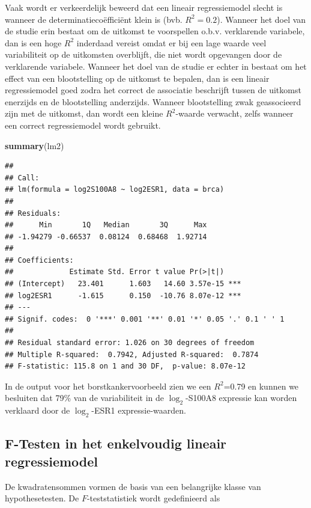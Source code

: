 \documentclass[
  12pt,dutch]{book}
\newenvironment{Shaded}{\begin{snugshade}}{\end{snugshade}}
\newcommand{\FunctionTok}[1]{\textcolor[rgb]{0.13,0.29,0.53}{\textbf{#1}}}
\newcommand{\NormalTok}[1]{#1}
\theoremstyle{definition}
\theoremstyle{definition}
\theoremstyle{definition}
\theoremstyle{definition}
\theoremstyle{remark}
\begin{document}
Vaak wordt er verkeerdelijk beweerd dat een lineair regressiemodel slecht is wanneer de determinatiecoëfficiënt klein is (bvb. \(R^2=0.2\)).
Wanneer het doel van de studie erin bestaat om de uitkomst te voorspellen o.b.v. verklarende variabele, dan is een hoge \(R^2\) inderdaad vereist omdat er bij een lage waarde veel variabiliteit op de uitkomsten overblijft, die niet wordt opgevangen door de verklarende variabele. Wanneer het doel van de studie er echter in bestaat om het effect van een blootstelling op de uitkomst te bepalen, dan is een lineair regressiemodel goed zodra het correct de associatie beschrijft tussen de uitkomst enerzijds en de blootstelling anderzijds.
Wanneer blootstelling zwak geassocieerd zijn met de uitkomst, dan wordt een kleine \(R^2\)-waarde verwacht, zelfs wanneer een correct regressiemodel wordt gebruikt.

\begin{Shaded}
\begin{Highlighting}[]
\FunctionTok{summary}\NormalTok{(lm2)}
\end{Highlighting}
\end{Shaded}

\begin{verbatim}
## 
## Call:
## lm(formula = log2S100A8 ~ log2ESR1, data = brca)
## 
## Residuals:
##      Min       1Q   Median       3Q      Max 
## -1.94279 -0.66537  0.08124  0.68468  1.92714 
## 
## Coefficients:
##             Estimate Std. Error t value Pr(>|t|)    
## (Intercept)   23.401      1.603   14.60 3.57e-15 ***
## log2ESR1      -1.615      0.150  -10.76 8.07e-12 ***
## ---
## Signif. codes:  0 '***' 0.001 '**' 0.01 '*' 0.05 '.' 0.1 ' ' 1
## 
## Residual standard error: 1.026 on 30 degrees of freedom
## Multiple R-squared:  0.7942, Adjusted R-squared:  0.7874 
## F-statistic: 115.8 on 1 and 30 DF,  p-value: 8.07e-12
\end{verbatim}

In de output voor het borstkankervoorbeeld zien we een \(R^2\)=0.79 en kunnen we besluiten dat 79\% van de variabiliteit in de \(\log_2\)-S100A8 expressie kan worden verklaard door de \(\log_2\)-ESR1 expressie-waarden.

\subsection{F-Testen in het enkelvoudig lineair regressiemodel}\label{f-testen-in-het-enkelvoudig-lineair-regressiemodel}

De kwadratensommen vormen de basis van een belangrijke klasse van hypothesetesten.
De \(F\)-teststatistiek wordt gedefinieerd als
\end{document}
